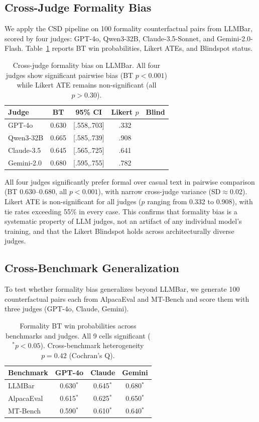 \documentclass[10pt,twocolumn]{article}
\newcommand{\cmark}{\checkmark}
\begin{document}
\subsection{Cross-Judge Formality Bias}\label{sec:crossjudge}

We apply the CSD pipeline on 100 formality counterfactual pairs from LLMBar, scored by four judges: GPT-4o, Qwen3-32B, Claude-3.5-Sonnet, and Gemini-2.0-Flash.
Table~\ref{tab:crossjudge} reports BT win probabilities, Likert ATEs, and Blindspot status.

\begin{table}[t]
\centering
\caption{Cross-judge formality bias on LLMBar. All four judges show significant pairwise bias (BT $p<0.001$) while Likert ATE remains non-significant (all $p>0.30$).}
\label{tab:crossjudge}
\small
\begin{tabular}{@{}lcccc@{}}
\toprule
Judge & BT & 95\% CI & Likert $p$ & Blind \\
\midrule
GPT-4o & 0.630 & [.558,.703] & .332 & \cmark \\
Qwen3-32B & 0.665 & [.585,.739] & .908 & \cmark \\
Claude-3.5 & 0.645 & [.565,.725] & .641 & \cmark \\
Gemini-2.0 & 0.680 & [.595,.755] & .782 & \cmark \\
\bottomrule
\end{tabular}
\end{table}

All four judges significantly prefer formal over casual text in pairwise comparison (BT 0.630--0.680, all $p<0.001$), with narrow cross-judge variance (SD$\approx$0.02).
Likert ATE is non-significant for all judges ($p$ ranging from 0.332 to 0.908), with tie rates exceeding 55\% in every case.
This confirms that formality bias is a systematic property of LLM judges, not an artifact of any individual model's training, and that the Likert Blindspot holds across architecturally diverse judges.

\subsection{Cross-Benchmark Generalization}\label{sec:crossbench}

To test whether formality bias generalizes beyond LLMBar, we generate 100 counterfactual pairs each from AlpacaEval and MT-Bench and score them with three judges (GPT-4o, Claude, Gemini).

\begin{table}[t]
\centering
\caption{Formality BT win probabilities across benchmarks and judges. All 9 cells significant ($^*p<0.05$). Cross-benchmark heterogeneity $p=0.42$ (Cochran's Q).}
\label{tab:crossbench}
\small
\begin{tabular}{@{}lccc@{}}
\toprule
Benchmark & GPT-4o & Claude & Gemini \\
\midrule
LLMBar & 0.630$^*$ & 0.645$^*$ & 0.680$^*$ \\
AlpacaEval & 0.615$^*$ & 0.625$^*$ & 0.650$^*$ \\
MT-Bench & 0.590$^*$ & 0.610$^*$ & 0.640$^*$ \\
\bottomrule
\end{tabular}
\end{table}
\end{document}
